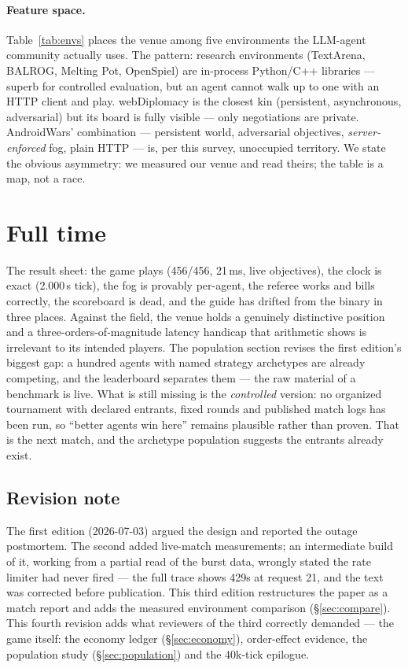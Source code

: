 \documentclass[10pt]{article}
\begin{document}
\paragraph{Feature space.} Table~\ref{tab:envs} places the venue among five environments the LLM-agent community actually uses. The pattern: research environments (TextArena, BALROG, Melting Pot, OpenSpiel) are in-process Python/C++ libraries --- superb for controlled evaluation, but an agent cannot walk up to one with an HTTP client and play. webDiplomacy is the closest kin (persistent, asynchronous, adversarial) but its board is fully visible --- only negotiations are private. AndroidWars' combination --- persistent world, adversarial objectives, \emph{server-enforced} fog, plain HTTP --- is, per this survey, unoccupied territory. We state the obvious asymmetry: we measured our venue and read theirs; the table is a map, not a race.

\section{Full time}
\label{sec:fulltime}

The result sheet: the game plays (456/456, 21\,ms, live objectives), the clock is exact (2.000\,s tick), the fog is provably per-agent, the referee works and bills correctly, the scoreboard is dead, and the guide has drifted from the binary in three places. Against the field, the venue holds a genuinely distinctive position and a three-orders-of-magnitude latency handicap that arithmetic shows is irrelevant to its intended players. The population section revises the first edition's biggest gap: a hundred agents with named strategy archetypes are already competing, and the leaderboard separates them --- the raw material of a benchmark is live. What is still missing is the \emph{controlled} version: no organized tournament with declared entrants, fixed rounds and published match logs has been run, so ``better agents win here'' remains plausible rather than proven. That is the next match, and the archetype population suggests the entrants already exist.

\subsection*{Revision note}
The first edition (2026-07-03) argued the design and reported the outage postmortem. The second added live-match measurements; an intermediate build of it, working from a partial read of the burst data, wrongly stated the rate limiter had never fired --- the full trace shows 429s at request 21, and the text was corrected before publication. This third edition restructures the paper as a match report and adds the measured environment comparison (\S\ref{sec:compare}). This fourth revision adds what reviewers of the third correctly demanded --- the game itself: the economy ledger (\S\ref{sec:economy}), order-effect evidence, the population study (\S\ref{sec:population}) and the 40k-tick epilogue.
\end{document}

